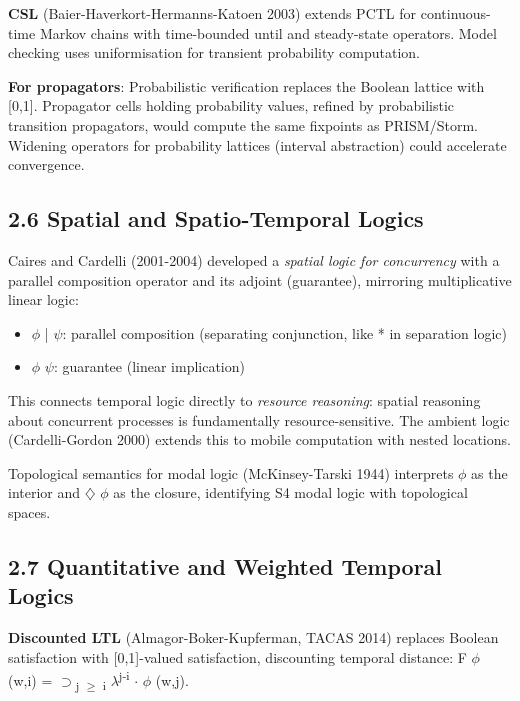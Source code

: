 \documentclass[11pt]{article}
\begin{document}
\textbf{CSL} (Baier-Haverkort-Hermanns-Katoen 2003) extends PCTL for continuous-time
Markov chains with time-bounded until and steady-state operators. Model
checking uses uniformisation for transient probability computation.

\textbf{For propagators}: Probabilistic verification replaces the Boolean lattice with
{[}0,1]. Propagator cells holding probability values, refined by probabilistic
transition propagators, would compute the same fixpoints as PRISM/Storm.
Widening operators for probability lattices (interval abstraction) could
accelerate convergence.
\subsection{2.6 Spatial and Spatio-Temporal Logics}
\label{sec:orga8a1ae0}

Caires and Cardelli (2001-2004) developed a \emph{spatial logic for concurrency}
with a parallel composition operator and its adjoint (guarantee), mirroring
multiplicative linear logic:

\begin{itemize}
\item \(\phi\) | \(\psi\): parallel composition (separating conjunction, like * in
separation logic)
\item \(\phi\) \triangleright \(\psi\): guarantee (linear implication)
\end{itemize}

This connects temporal logic directly to \emph{resource reasoning}: spatial
reasoning about concurrent processes is fundamentally resource-sensitive.
The ambient logic (Cardelli-Gordon 2000) extends this to mobile computation
with nested locations.

Topological semantics for modal logic (McKinsey-Tarski 1944) interprets
\Box \(\phi\) as the interior and \(\diamondsuit\) \(\phi\) as the closure, identifying
S4 modal logic with topological spaces.
\subsection{2.7 Quantitative and Weighted Temporal Logics}
\label{sec:orgdb916fe}

\textbf{Discounted LTL} (Almagor-Boker-Kupferman, TACAS 2014) replaces Boolean
satisfaction with [0,1]-valued satisfaction, discounting temporal distance:
\llbracket F \(\phi\) \rrbracket(w,i) = \(\supset\)\textsubscript{j \(\ge\) i} \(\lambda\)\textsuperscript{j-i} \(\cdot\) \llbracket \(\phi\) \rrbracket(w,j).
\end{document}

